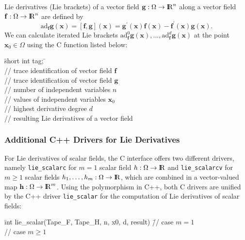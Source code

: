 \documentclass[11pt,twoside]{article}
\newcommand{\R}{{ {\rm I} \kern -.225em {\rm R} }}
\begin{document}
Lie derivatives (Lie brackets) of a vector field $\mathbf g: \Omega \rightarrow \R^n$ along a vector field $\mathbf f: \Omega \rightarrow \R^n$ are defined by
\[
 \mathrm{ad}_\mathbf{f}\mathbf{g}(\mathbf{x})=[\mathbf{f},\mathbf{g}](\mathbf{x})
 =\mathbf{g}^{\prime}(\mathbf{x})\mathbf{f}(\mathbf{x})-\mathbf{f}^{\prime}(\mathbf{x})\mathbf{g}(\mathbf{x}).
\]
We can calculate iterated Lie brackets $\mathrm{ad}_\mathbf{f}^0\mathbf{g}(\mathbf{x}),\ldots,\mathrm{ad}_\mathbf{f}^{d}\mathbf{g}(\mathbf{x})$ at the point $\mathbf{x}_0\in\Omega$ 
using the C function listed below:

\begin{tabbing}
\hspace{0.5in}\={\sf short int tag;} \hspace{1.1in}\= \kill    %
\\
         \> // trace identification of vector field $\mathbf f$ \\
         \> // trace identification of vector field $\mathbf g$\\
               \> // number of independent variables $n$\\
          \> // values of independent variables $\mathbf{x}_0$\\
               \> // highest derivative degree $d$\\
 \> // resulting Lie derivatives of a vector field\\
\end{tabbing} 

\subsubsection*{Additional C++ Drivers for Lie Derivatives}

For Lie derivatives of scalar fields, the C interface offers two different drivers, namely {\verb=lie_scalarc=} for $m=1$ scalar field $h:\Omega\to\R$ and {\verb=lie_scalarcv=} for $m\geq1$ scalar fields $h_1,\ldots,h_m:\Omega\to\R$, which are combined in a vector-valued map $\mathbf{h}:\Omega\to\R^m$. Using the polymorphism in C++, both C drivers are unified by the C++ driver {\verb=lie_scalar=} for the computation of Lie derivatives of scalar fields:

\begin{tabbing}
\hspace{0.5in}\={\sf int lie\_scalar(Tape\_F, Tape\_H, n, x0, d, result)} \hspace{0.45in}\= // case $m=1$\\
 \> // case $m\geq1$
\end{tabbing} 
\end{document}
